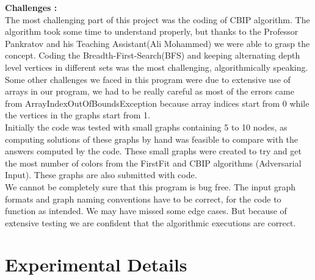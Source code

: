 \documentclass{article}
\begin{document}
\textbf{Challenges :}\\

The most challenging part of this project was the coding of CBIP algorithm. The algorithm took some time to understand properly, but thanks to the
 Professor Pankratov and his Teaching Assistant(Ali Mohammed) we were able to grasp the concept. Coding the Breadth-First-Search(BFS)  
and keeping alternating depth level vertices in different sets was the most challenging, algorithmically speaking. \\

Some other challenges we faced in this program were due to extensive use of arrays in our program, we had to be really careful as most of the errors
 came from ArrayIndexOutOfBoundsException because array indices start from 0 while the vertices in the graphs start from 1.\\

Initially the code was tested with small graphs containing 5 to 10 nodes, as computing solutions of these graphs by hand was feasible to compare
 with the answers computed by the code. These small graphs were created to try and get the most number of colors from the FirstFit and CBIP algorithms (Adversarial Input). These graphs are also submitted with code.\\ 

We cannot be completely sure that this program is bug free. The input graph formats and graph naming conventions have to be correct, for the 
code to function as intended. We may have missed some edge cases. But because of extensive testing we are confident that the
 algorithmic executions are correct. 

\section{Experimental Details}
\end{document}
